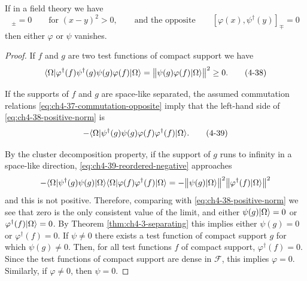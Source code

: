 \begin{theorem}[4-8]\label{thm:ch4-8}

If in a field theory we have
\begin{equation}
  [\varphi(x),\psi(y)]_{\pm}=0
  \qquad\text{for }(x-y)^2>0,
  \qquad\text{and the opposite}
  \qquad
  [\varphi(x),\psi^\dagger(y)]_{\mp}=0
  \tag{4-37}\label{eq:ch4-37-commutation-opposite}
\end{equation}
then either $\varphi$ or $\psi$ vanishes.
\end{theorem}

\begin{proof}

If $f$ and $g$ are two test functions of compact support we have
\begin{equation}
  \langle \Omega\rvert\varphi^\dagger(f)\psi^\dagger(g)\psi(g)\varphi(f)\lvert \Omega\rangle
  =\bigl\lVert\psi(g)\varphi(f)\lvert \Omega\rangle\bigr\rVert^2\geq0.
  \tag{4-38}\label{eq:ch4-38-positive-norm}
\end{equation}

If the supports of $f$ and $g$ are space-like separated, the assumed
commutation relations \eqref{eq:ch4-37-commutation-opposite} imply that the left-hand side of \eqref{eq:ch4-38-positive-norm} is
\begin{equation}
  -\langle \Omega\rvert\psi^\dagger(g)\psi(g)\varphi(f)\varphi^\dagger(f)\lvert \Omega\rangle.
  \tag{4-39}\label{eq:ch4-39-reordered-negative}
\end{equation}

By the cluster decomposition property, if the support of $g$ runs to infinity
in a space-like direction, \eqref{eq:ch4-39-reordered-negative} approaches
\begin{equation*}
  -\langle \Omega\rvert\psi^\dagger(g)\psi(g)\lvert \Omega\rangle
   \langle \Omega\rvert\varphi(f)\varphi^\dagger(f)\lvert \Omega\rangle
  =-\bigl\lVert\psi(g)\lvert \Omega\rangle\bigr\rVert^2
   \bigl\lVert\varphi^\dagger(f)\lvert \Omega\rangle\bigr\rVert^2
\end{equation*}
and this is not positive.  Therefore, comparing with \eqref{eq:ch4-38-positive-norm} we see that zero
is the only consistent value of the limit, and either
$\psi(g)\lvert \Omega\rangle=0$ or $\varphi^\dagger(f)\lvert \Omega\rangle=0$.  By Theorem \ref{thm:ch4-3-separating}
this implies either $\psi(g)=0$ or $\varphi^\dagger(f)=0$.  If $\psi\ne0$
there exists a test function of compact support $g$ for which $\psi(g)\ne0$.
Then, for all test functions $f$ of compact support, $\varphi^\dagger(f)=0$.
Since the test functions of compact support are dense in $\mathcal F$, this
implies $\varphi=0$.  Similarly, if $\varphi\ne0$, then $\psi=0$.
\end{proof}

